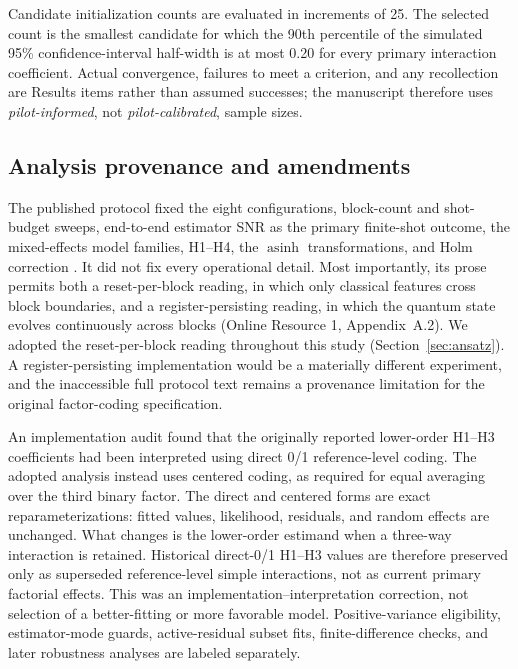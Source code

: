 \documentclass[pdflatex,sn-basic,Numbered]{sn-jnl}
\begin{document}
Candidate initialization counts are evaluated in increments of 25. The selected count is the smallest candidate for which the 90th percentile of the simulated 95\% confidence-interval half-width is at most 0.20 for every primary interaction coefficient. Actual convergence, failures to meet a criterion, and any recollection are Results items rather than assumed successes; the manuscript therefore uses \emph{pilot-informed}, not \emph{pilot-calibrated}, sample sizes.


\subsection{Analysis provenance and amendments}\label{sec:provenance}

The published protocol fixed the eight configurations, block-count and shot-budget sweeps, end-to-end estimator SNR as the primary finite-shot outcome, the mixed-effects model families, H1--H4, the $\operatorname{asinh}$ transformations, and Holm correction \cite{shen2026gradient}. It did not fix every operational detail. Most importantly, its prose permits both a reset-per-block reading, in which only classical features cross block boundaries, and a register-persisting reading, in which the quantum state evolves continuously across blocks (Online Resource 1, Appendix~A.2). We adopted the reset-per-block reading throughout this study (Section~\ref{sec:ansatz}). A register-persisting implementation would be a materially different experiment, and the inaccessible full protocol text remains a provenance limitation for the original factor-coding specification.

An implementation audit found that the originally reported lower-order H1--H3 coefficients had been interpreted using direct 0/1 reference-level coding. The adopted analysis instead uses centered coding, as required for equal averaging over the third binary factor. The direct and centered forms are exact reparameterizations: fitted values, likelihood, residuals, and random effects are unchanged. What changes is the lower-order estimand when a three-way interaction is retained. Historical direct-0/1 H1--H3 values are therefore preserved only as superseded reference-level simple interactions, not as current primary factorial effects. This was an implementation--interpretation correction, not selection of a better-fitting or more favorable model. Positive-variance eligibility, estimator-mode guards, active-residual subset fits, finite-difference checks, and later robustness analyses are labeled separately.
\end{document}
